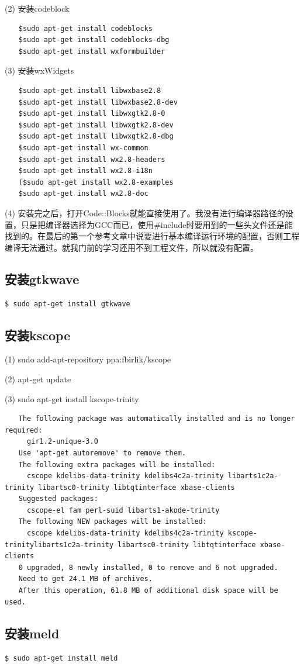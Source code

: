 (2) 安装codeblock
\begin{verbatim}
　　$sudo apt-get install codeblocks
　　$sudo apt-get install codeblocks-dbg
　　$sudo apt-get install wxformbuilder
\end{verbatim}

(3) 安装wxWidgets
\begin{verbatim}
　　$sudo apt-get install libwxbase2.8
　　$sudo apt-get install libwxbase2.8-dev
　　$sudo apt-get install libwxgtk2.8-0
　　$sudo apt-get install libwxgtk2.8-dev
　　$sudo apt-get install libwxgtk2.8-dbg
　　$sudo apt-get install wx-common
　　$sudo apt-get install wx2.8-headers
　　$sudo apt-get install wx2.8-i18n
　　($sudo apt-get install wx2.8-examples
　　$sudo apt-get install wx2.8-doc
\end{verbatim}

(4) 安装完之后，打开Code::Blocks就能直接使用了。我没有进行编译器路径的设置，只是把编译器选择为GCC而已，使用\#include时要用到的一些头文件还是能找到的。在最后的第一个参考文章中说要进行基本编译运行环境的配置，否则工程编译无法通过。就我门前的学习还用不到工程文件，所以就没有配置。

\subsection{安装gtkwave}
\verb"$ sudo apt-get install gtkwave"

\subsection{安装kscope}
(1) sudo add-apt-repository ppa:fbirlik/kscope

(2) apt-get update

(3) sudo apt-get install kscope-trinity
\begin{verbatim}
　　The following package was automatically installed and is no longer required:
　　  gir1.2-unique-3.0
　　Use 'apt-get autoremove' to remove them.
　　The following extra packages will be installed:
　　  cscope kdelibs-data-trinity kdelibs4c2a-trinity libarts1c2a-trinity libartsc0-trinity libtqtinterface xbase-clients
　　Suggested packages:
　　  cscope-el fam perl-suid libarts1-akode-trinity
　　The following NEW packages will be installed:
　　  cscope kdelibs-data-trinity kdelibs4c2a-trinity kscope-trinitylibarts1c2a-trinity libartsc0-trinity libtqtinterface xbase-clients
　　0 upgraded, 8 newly installed, 0 to remove and 6 not upgraded.
　　Need to get 24.1 MB of archives.
　　After this operation, 61.8 MB of additional disk space will be used.
\end{verbatim}

\subsection{安装meld}
\verb"$ sudo apt-get install meld"

